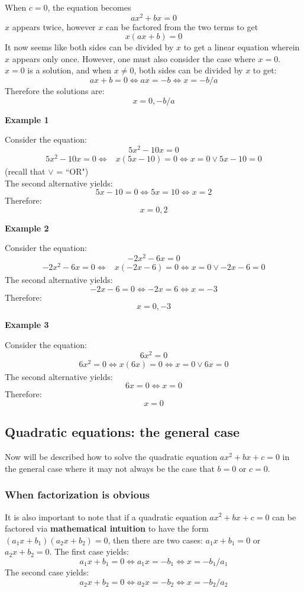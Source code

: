 \documentclass{article}
\begin{document}
When \(c = 0\), the equation becomes
\[ax^2 + bx = 0\]
\(x\) appears twice, however \(x\) can be factored from the two terms to get
\[x(ax + b) = 0\]
It now seems like both sides can be divided by \(x\) to get a linear equation wherein \(x\) appears only once. However, one must also consider the case where \(x = 0\). \(x = 0\) is a solution, and when \(x \neq 0\), both sides can be divided by \(x\) to get:
\[ax + b = 0 \iff ax = -b \iff x = -b/a\]
Therefore the solutions are:
\[x = 0, -b/a\]

\textbf{Example 1}

Consider the equation:
\[5x^2 - 10x = 0\]
\begin{align*}
5x^2 - 10x = 0 
\iff & x(5x - 10) = 0 
\iff x = 0 \vee 5x - 10 = 0 
\end{align*}
(recall that \(\vee\) = ``OR") \\
The second alternative yields:
\[5x - 10 = 0 \iff 5x = 10 \iff x = 2\]
Therefore:
\[x = 0, 2\]

\textbf{Example 2}

Consider the equation:
\[-2x^2 - 6x = 0\]
\begin{align*}
-2x^2 - 6x = 0 
\iff & x(-2x - 6) = 0  
\iff x = 0 \vee -2x - 6 = 0
\end{align*}
The second alternative yields:
\[-2x - 6 = 0 \iff -2x = 6 \iff x = -3\]
Therefore:
\[x = 0, -3\]

\textbf{Example 3}

Consider the equation:
\[6x^2 = 0\]
\begin{align*}
6x^2 = 0 
\iff x(6x) = 0
\iff x = 0 \vee 6x = 0
\end{align*}
The second alternative yields:
\[6x = 0 \iff x = 0\]
Therefore:
\[x = 0\]



\subsection*{Quadratic equations: the general case}

Now will be described how to solve the quadratic equation \(ax^2 + bx + c = 0\) in the general case where it may not always be the case that \(b = 0\) or \(c = 0\).

\subsubsection*{When factorization is obvious}

It is also important to note that if a quadratic equation \(ax^2 + bx + c = 0\) can be factored via {\bf mathematical intuition} to have the form \((a_1x + b_1)(a_2x + b_2) = 0\), then there are two cases: \(a_1x + b_1 = 0\) or \(a_2x + b_2 = 0\). The first case yields:
\[a_1x + b_1 = 0 \iff a_1x = -b_1 \iff x = -b_1/a_1\]
The second case yields: 
\[a_2x + b_2 = 0 \iff a_2x = -b_2 \iff x = -b_2/a_2\]
\end{document}
